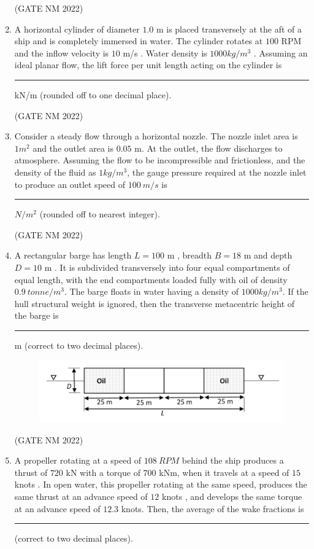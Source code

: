 \documentclass[journal,12pt,onecolumn]{IEEEtran}
\theoremstyle{remark}
\begin{document}
\begin{enumerate}
 \hfill(GATE NM 2022)

\item A horizontal cylinder of diameter $1.0$ m  is placed transversely at the aft of a ship and is completely immersed in water.  
The cylinder rotates at $100$ RPM  and the inflow velocity is $10$ m/s . Water density is $1000 kg/m^3 $ .  
Assuming an ideal planar flow, the lift force per unit length acting on the cylinder is  
\rule{3cm}{0.15mm}  kN/m (rounded off to one decimal place).

\hfill(GATE NM 2022)
 
\item Consider a steady flow through a horizontal nozzle.  
The nozzle inlet area is $1 m^2 $  and the outlet area is $0.05$ m.  
At the outlet, the flow discharges to atmosphere.  
Assuming the flow to be incompressible and frictionless, and the density of the fluid as  
$1  kg/m^3$, the gauge pressure required at the nozzle inlet to produce an outlet speed  
of $100\ m/s $ is \rule{3cm}{0.15mm}  $N/m^2 $ (rounded off to nearest integer).

\hfill(GATE NM 2022)

\item A rectangular barge has length $L = 100$ m , breadth $B = 18 $ m  and depth $D = 10$ m .  
It is subdivided transversely into four equal compartments of equal length, with the end compartments loaded fully with oil of density $0.9\ tonne/m^3 $.  
The barge floats in water having a density of $1000  kg/m^3 $.  
If the hull structural weight is ignored, then the transverse metacentric height of the barge is  
\rule{3cm}{0.15mm}  m (correct to two decimal places).
\begin{figure}[h]
\centering
	\includegraphics[width=0.3\columnwidth]{fig14}
	\caption{}
	\label{fig:placeholder}
\end{figure}

\hfill(GATE NM 2022)
 
\item A propeller rotating at a speed of $108\ RPM $ behind the ship produces a thrust of  
$720$ kN  with a torque of $700$ kNm, when it travels at a speed of  
$15$ knots .  
In open water, this propeller rotating at the same speed, produces the same thrust at an  
advance speed of $12$ knots , and develops the same torque at an advance speed  
of $12.3$ knots.  
Then, the average of the wake fractions is \rule{3cm}{0.15mm}  (correct to two decimal places).


\end{enumerate}
\end{document}
